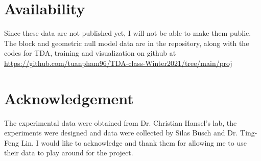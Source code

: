 \section{Availability}

Since these data are not published yet, I will not be able to make them public. The block and geometric null model data are in the repository, along with the codes for TDA, training and visualization on github at \url{https://github.com/tuanpham96/TDA-class-Winter2021/tree/main/proj}

\section{Acknowledgement}

The experimental data were obtained from Dr. Christian Hansel's lab, the experiments were designed and data were collected by Silas Busch and Dr. Ting-Feng Lin. I would like to acknowledge and thank them for allowing me to use their data to play around for the project.